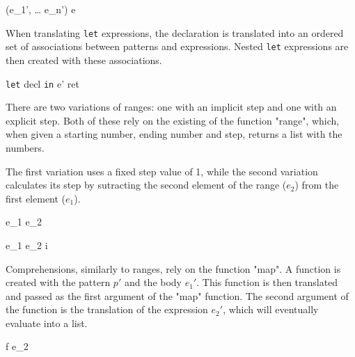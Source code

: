 \documentclass[class=article, crop=false]{standalone}
\begin{document}
  {\gamma \vdash (e_1', \; \dots \; e_n') \Rightarrow e}

\bigskip

When translating \texttt{let} expressions, the declaration is translated into an ordered set of associations between patterns and expressions.
Nested \texttt{let} expressions are then created with these associations.

  {\gamma \vdash \texttt{let} \; decl\; \texttt{in} \; e' \Rightarrow ret}

\bigskip

There are two variations of ranges: one with an implicit step and one with an explicit step.
Both of these rely on the existing of the function "range", which, when given a starting number, ending number and step, returns a list with the numbers.

The first variation uses a fixed step value of 1, while the second variation calculates its step by sutracting the second element of the range ($e_2$) from the first element ($e_1$).

  {\gamma \vdash [e_1' \; .. \; e_2'] \Rightarrow {} \; e_1 \; e_2 }

  {\gamma \vdash [e_1', \; e_2' \; .. \; e_3'] \Rightarrow {} \; e_1 \; e_2 \; i}

\bigskip

Comprehensions, similarly to ranges, rely on the function "map".
A function is created with the pattern $p'$ and the body $e_1'$.
This function is then translated and passed as the first argument of the "map" function.
The second argument of the function is the translation of the expression $e_2'$, which will eventually evaluate into a list.

  {\gamma {} \Rightarrow {} \; f \; e_2}
\end{document}
